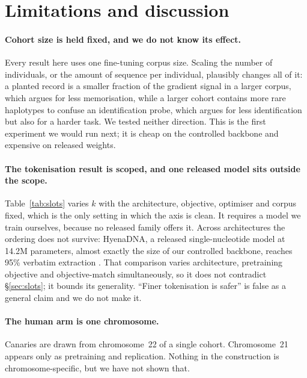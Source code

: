 \section{Limitations and discussion}
\label{sec:discussion}

\paragraph{Cohort size is held fixed, and we do not know its effect.}
Every result here uses one fine-tuning corpus size. Scaling the number of individuals, or the amount
of sequence per individual, plausibly changes all of it: a planted record is a smaller fraction of
the gradient signal in a larger corpus, which argues for less memorisation, while a larger cohort
contains more rare haplotypes to confuse an identification probe, which argues for less
identification but also for a harder task. We tested neither direction. This is the first
experiment we would run next; it is cheap on the controlled backbone and expensive on released
weights.

\paragraph{The tokenisation result is scoped, and one released model sits outside the scope.}
Table~\ref{tab:slots} varies $k$ with the architecture, objective, optimiser and corpus fixed, which
is the only setting in which the axis is clean. It requires a model we train ourselves, because no
released family offers it. Across architectures the ordering does not survive: HyenaDNA, a released
single-nucleotide model at 14.2M parameters, almost exactly the size of our controlled backbone,
reaches 95\% verbatim extraction \citep{nguyen2023hyenadna}. That comparison varies architecture,
pretraining objective and objective-match simultaneously, so it does not contradict
\S\ref{sec:slots}; it bounds its generality. ``Finer tokenisation is safer'' is false as a general
claim and we do not make it.

\paragraph{The human arm is one chromosome.}
Canaries are drawn from chromosome~22 of a single cohort. Chromosome~21 appears only as pretraining
and replication. Nothing in the construction is chromosome-specific, but we have not shown that.

